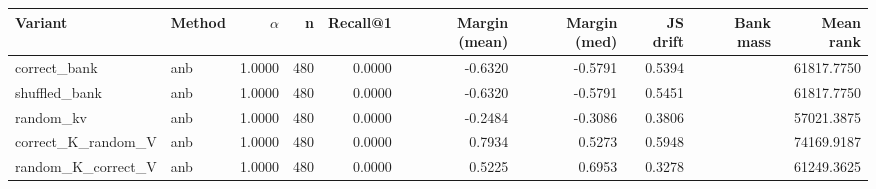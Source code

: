 \begin{tabular}{l l r r r r r r r r}
\toprule
Variant & Method & $\alpha$ & n & Recall@1 & Margin (mean) & Margin (med) & JS drift & Bank mass & Mean rank \\
\midrule
correct\_bank & anb & 1.0000 & 480 & 0.0000 & -0.6320 & -0.5791 & 0.5394 &  & 61817.7750 \\
shuffled\_bank & anb & 1.0000 & 480 & 0.0000 & -0.6320 & -0.5791 & 0.5451 &  & 61817.7750 \\
random\_kv & anb & 1.0000 & 480 & 0.0000 & -0.2484 & -0.3086 & 0.3806 &  & 57021.3875 \\
correct\_K\_random\_V & anb & 1.0000 & 480 & 0.0000 & 0.7934 & 0.5273 & 0.5948 &  & 74169.9187 \\
random\_K\_correct\_V & anb & 1.0000 & 480 & 0.0000 & 0.5225 & 0.6953 & 0.3278 &  & 61249.3625 \\
\bottomrule
\end{tabular}
